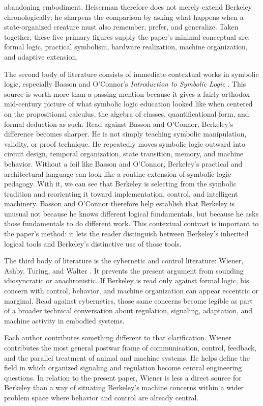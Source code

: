 \documentclass[11pt]{article}
\begin{document}
abandoning embodiment. Heiserman therefore does not merely extend Berkeley chronologically; he sharpens the comparison by asking what happens when a state-organized creature must also remember, prefer, and generalize. Taken together, these five primary figures supply the paper's minimal conceptual arc: formal logic, practical symbolism, hardware realization, machine organization, and adaptive extension.

The second body of literature consists of immediate contextual works in symbolic logic, especially Basson and O'Connor's \emph{Introduction to Symbolic Logic} \citep{basson1960introduction}. This source is worth more than a passing mention because it gives a fairly orthodox mid-century picture of what symbolic logic education looked like when centered on the propositional calculus, the algebra of classes, quantificational form, and formal deduction as such. Read against Basson and O'Connor, Berkeley's difference becomes sharper. He is not simply teaching symbolic manipulation, validity, or proof technique. He repeatedly moves symbolic logic outward into circuit design, temporal organization, state transition, memory, and machine behavior. Without a foil like Basson and O'Connor, Berkeley's practical and architectural language can look like a routine extension of symbolic-logic pedagogy. With it, we can see that Berkeley is selecting from the symbolic tradition and reorienting it toward implementation, control, and intelligent machinery. Basson and O'Connor therefore help establish that Berkeley is unusual not because he knows different logical fundamentals, but because he asks those fundamentals to do different work. This contextual contrast is important to the paper's method: it lets the reader distinguish between Berkeley's inherited logical tools and Berkeley's distinctive use of those tools.

The third body of literature is the cybernetic and control literature: Wiener, Ashby, Turing, and Walter \citep{wiener1948cybernetics,ashby1952design,ashby1956introduction,turing1948intelligent,turing1950computing,walter1953living}. It prevents the present argument from sounding idiosyncratic or anachronistic. If Berkeley is read only against formal logic, his concern with control, behavior, and machine organization can appear eccentric or marginal. Read against cybernetics, those same concerns become legible as part of a broader technical conversation about regulation, signaling, adaptation, and machine activity in embodied systems.

Each author contributes something different to that clarification. Wiener contributes the most general postwar frame of communication, control, feedback, and the parallel treatment of animal and machine systems. He helps define the field in which organized signaling and regulation become central engineering questions. In relation to the present paper, Wiener is less a direct source for Berkeley than a way of situating Berkeley's machine concerns within a wider problem space where behavior and control are already central.
\end{document}
